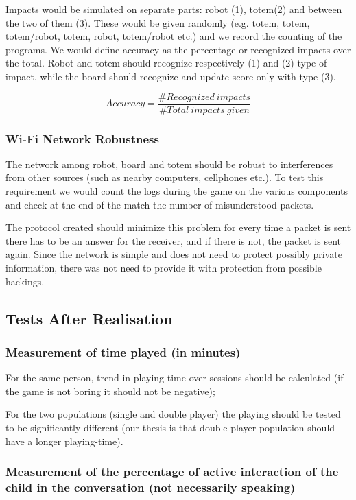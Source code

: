 \documentclass[a4paper,twoside]{book}
\begin{document}
Impacts would be simulated on separate parts: robot (1), totem(2) and between the two of them (3). These would be given randomly (e.g. totem, totem, totem/robot, totem, robot, totem/robot etc.) and we record the counting of the programs. We would define accuracy as the percentage or recognized impacts over the total. Robot and totem should recognize respectively (1) and (2) type of impact, while the board should recognize and update score only with type (3).

\[Accuracy=\frac{\#Recognized\ impacts}{\#Total\ impacts\ given}\]

\subsubsection*{Wi-Fi Network Robustness}

The network among robot, board and totem should be robust to interferences from other sources (such as nearby computers, cellphones etc.). To test this requirement we would count the logs during the game on the various components and check at the end of the match the number of misunderstood packets. 

The protocol created should minimize this problem for every time a packet is sent there has to be an answer for the receiver, and if there is not, the packet is sent again. Since the network is simple and does not need to protect possibly private information, there was not need to provide it with protection from possible hackings.

\subsection{Tests After Realisation}

\subsubsection*{Measurement of time played (in minutes)}

For the same person, trend in playing time over sessions should be calculated (if the game is not boring it should not be negative);

For the two populations (single and double player) the playing should be tested to be significantly different (our thesis is that double player population should have a longer playing-time).

\subsubsection*{Measurement of the percentage of active interaction of the child in the conversation (not necessarily speaking)}
\end{document}

